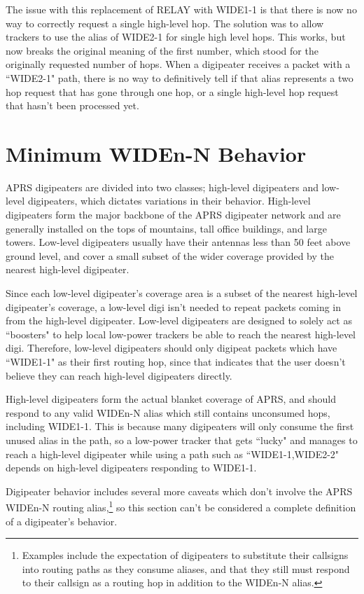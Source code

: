The issue with this replacement of RELAY with WIDE1-1 is that there is now
no way to correctly request a single high-level hop.
The solution was to allow trackers to use the alias of WIDE2-1 for single
high level hops.
This works, but now breaks the original meaning of the first number,
which stood for the originally requested number of hops.
When a digipeater receives a packet with a ``WIDE2-1" path, 
there is no way to definitively
tell if that alias represents a two hop request that has gone through one hop,
or a single high-level hop request that hasn't been processed yet.

\section{Minimum WIDEn-N Behavior}

APRS digipeaters are divided into two classes; high-level digipeaters and
low-level digipeaters, which dictates variations in their behavior.
High-level digipeaters form the major backbone of the APRS digipeater network
and are generally installed on the tops of mountains,
tall office buildings, and large towers.
Low-level digipeaters usually have their antennas less than 50 feet above ground
level, and cover a small subset of the wider coverage provided by the
nearest high-level digipeater.

Since each low-level digipeater's coverage area is a subset of the
nearest high-level digipeater's coverage, a low-level digi isn't needed
to repeat packets coming in from the high-level digipeater.
Low-level digipeaters are designed to solely act as ``boosters" to
help local low-power trackers be able to reach the nearest high-level digi.
Therefore, low-level digipeaters should only digipeat packets which
have ``WIDE1-1" as their first routing hop, since that indicates that
the user doesn't believe they can reach high-level digipeaters directly.

High-level digipeaters form the actual blanket coverage of APRS, and
should respond to any valid WIDEn-N alias which still contains unconsumed hops,
including WIDE1-1. This is because many digipeaters will only consume the first
unused alias in the path, so a low-power tracker that gets ``lucky" and manages to
reach a high-level digipeater while using a path such as ``WIDE1-1,WIDE2-2"
depends on high-level digipeaters responding to WIDE1-1.

Digipeater behavior includes several more caveats which don't involve the APRS
WIDEn-N routing alias,\footnote{Examples include the expectation of digipeaters
	to substitute their callsigns into routing paths as they consume aliases,
	and that they still must respond to their callsign as a routing hop in 
addition to the WIDEn-N alias.} 
so this section can't be considered a complete definition of a digipeater's behavior.

